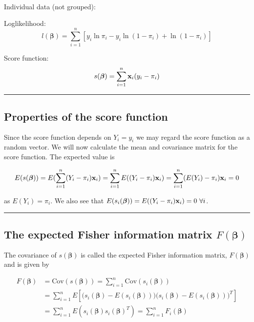 \documentclass[
]{article}
\begin{document}
Individual data (not grouped):

Loglikelihood:
\[l(\boldsymbol{\beta})=\sum_{i=1}^n[y_i \ln \pi_i-y_i\ln(1-\pi_i)+\ln(1-\pi_i)]\]

Score function:
\[s(\boldsymbol{\beta})=\sum_{i=1}^n {\bf x}_i (y_i-\pi_i)\]

\begin{center}\rule{0.5\linewidth}{0.5pt}\end{center}

\hypertarget{properties-of-the-score-function}{%
\subsection{Properties of the score
function}\label{properties-of-the-score-function}}

Since the score function depends on \(Y_i=y_i\) we may regard the score
function as a random vector. We will now calculate the mean and
covariance matrix for the score function. The expected value is

\[E(s(\boldsymbol{\beta})) = E(\sum_{i=1}^n(Y_i-\pi_i){\bf x}_i) = \sum_{i=1}^nE((Y_i-\pi_i){\bf x}_i) = \sum_{i=1}^n(E(Y_i)-\pi_i){\bf x}_i = 0 \]

as \(E(Y_i) = \pi_i\). We also see that
\(E(s_i(\boldsymbol{\beta})) = E((Y_i-\pi_i){\bf x}_i) = 0 \ \forall i\).

\begin{center}\rule{0.5\linewidth}{0.5pt}\end{center}

\hypertarget{the-expected-fisher-information-matrix-fboldsymbolbeta}{%
\subsection{\texorpdfstring{The expected Fisher information matrix
\(F(\boldsymbol{\beta})\)}{The expected Fisher information matrix F(\textbackslash boldsymbol\{\textbackslash beta\})}}\label{the-expected-fisher-information-matrix-fboldsymbolbeta}}

The covariance of \(s(\boldsymbol{\beta})\) is called the expected
Fisher information matrix, \(F(\boldsymbol{\beta})\) and is given by

\begin{align} F(\boldsymbol{\beta}) &= \text{Cov}(s(\boldsymbol{\beta})) =   \sum_{i=1}^n \text{Cov}(s_i(\boldsymbol{\beta})) \\
&= \sum_{i=1}^n E\left[\Big(s_i(\boldsymbol{\beta}) - E(s_i(\boldsymbol{\beta}))\Big)\Big(s_i(\boldsymbol{\beta})-E(s_i(\boldsymbol{\beta}))\Big)^T\right] \\
&= \sum_{i=1}^n E(s_i(\boldsymbol{\beta})s_i(\boldsymbol{\beta})^T) = \sum_{i=1}^n F_i(\boldsymbol{\beta}) 
\end{align}
\end{document}

